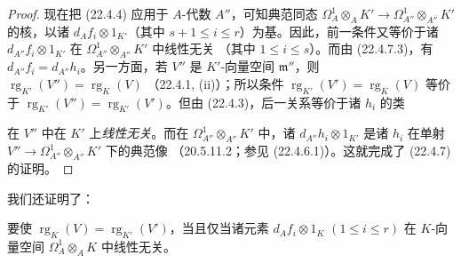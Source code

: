 \begin{proof}
现在把 (22.4.4) 应用于 $A$-代数 $A''$，可知典范同态
$\Omega^1_A\otimes_AK'\longrightarrow\Omega^1_{A''}\otimes_{A''}K'$
的核，以诸 $d_Af_i\otimes1_{K'}$（其中
$s+1\leqslant i\leqslant r$）为基。因此，前一条件又等价于诸
$d_{A''}f_i\otimes1_{K'}$ 在 $\Omega^1_{A''}\otimes_{A''}K'$ 中线性无关
（其中 $1\leqslant i\leqslant s$）。而由 (22.4.7.3)，有
$d_{A''}f_i=d_{A''}h_i$。另一方面，若 $V''$ 是 $K'$-向量空间
$\mathfrak m''$，则
$\operatorname{rg}_{K'}(V'')=\operatorname{rg}_K(V)$
（22.4.1, (ii)）；所以条件
$\operatorname{rg}_{K'}(V')=\operatorname{rg}_K(V)$ 等价于
$\operatorname{rg}_{K'}(V'')=\operatorname{rg}_{K'}(V')$。但由
(22.4.3)，后一关系等价于诸 $h_i$ 的类


在 $V''$ 中在 $K'$ 上\emph{线性无关}。而在
$\Omega^1_{A''}\otimes_{A''}K'$ 中，诸
$d_{A''}h_i\otimes1_{K'}$ 是诸 $h_i$ 在单射
$V''\longrightarrow\Omega^1_{A''}\otimes_{A''}K'$ 下的典范像
（20.5.11.2；参见 (22.4.6.1)）。这就完成了 (22.4.7) 的证明。
\end{proof}

我们还证明了：

\begin{corollary}[22.4.7.4]
\label{0.22.4.7.4-fr}
要使 $\operatorname{rg}_K(V)=\operatorname{rg}_{K'}(V')$，当且仅当诸元素
$d_Af_i\otimes1_K$ $(1\leqslant i\leqslant r)$ 在 $K$-向量空间
$\Omega^1_A\otimes_AK$ 中线性无关。
\end{corollary}


